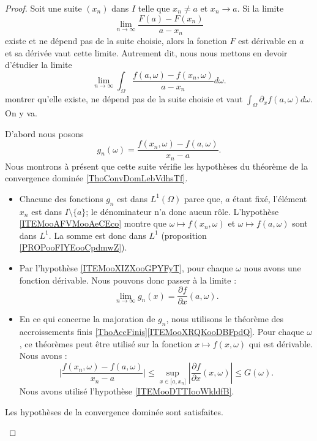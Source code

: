 \begin{proof}
	Soit une suite \( (x_n)\) dans \( I\) telle que \( x_n\neq a\) et \( x_n\to a\). Si la limite
	\begin{equation}
		\lim_{n\to \infty} \frac{ F(a)-F(x_n) }{ a-x_n }
	\end{equation}
	existe et ne dépend pas de la suite choisie, alors la fonction \( F\) est dérivable en \( a\) et sa dérivée vaut cette limite. Autrement dit, nous nous mettons en devoir d'étudier la limite
	\begin{equation}    \label{EqLIiralx}
		\lim_{n\to \infty} \int_{\Omega}\frac{ f(a,\omega)-f(x_n,\omega) }{ a-x_n }d\omega.
	\end{equation}
	montrer qu'elle existe, ne dépend pas de la suite choisie et vaut \( \int_{\Omega}\partial_xf(a,\omega)d\omega\). On y va.

	\begin{subproof}
		D'abord nous posons
		\begin{equation}    \label{EqAFOUbQB}
			g_n(\omega)=\frac{ f(x_n,\omega)-f(a,\omega) }{ x_n-a }.
		\end{equation}
		Nous montrons à présent que cette suite vérifie les hypothèses du théorème de la convergence dominée \ref{ThoConvDomLebVdhsTf}.
		\begin{itemize}
			\item
			      Chacune des fonctions \( g_n\) est dans \( L^1(\Omega)\) parce que, \( a\) étant fixé, l'élément \( x_n\) est dans \( I\setminus\{ a \}\); le dénominateur n'a donc aucun rôle. L'hypothèse \ref{ITEMooAFVMooAeCEco} montre que \( \omega\mapsto f(x_n,\omega)\) et \( \omega\mapsto f(a,\omega)\) sont dans \( L^1\). La somme est donc dans \( L^1\) (proposition \ref{PROPooFIYEooCpdmwZ}).
			\item
			      Par l'hypothèse \ref{ITEMooXIZXooGPYFyT}, pour chaque \( \omega\) nous avons une fonction dérivable. Nous pouvons donc passer à la limite :
			      \begin{equation}
				      \lim_{n\to \infty} g_n(x)=\frac{ \partial f }{ \partial x }(a,\omega).
			      \end{equation}
			\item
			      En ce qui concerne la majoration de \( g_n\), nous utilisons le théorème des accroissements finis \ref{ThoAccFinis}\ref{ITEMooXRQKooDBFpdQ}. Pour chaque \( \omega\), ce théorèmes peut être utilisé sur la fonction \( x\mapsto f(x,\omega)\) qui est dérivable. Nous avons :
			      \begin{equation}
				      \big| \frac{  f(x_n,\omega)-f(a,\omega)   }{ x_n-a  } \big|\leq \sup_{x\in \mathopen[ a , x_n \mathclose]}| \frac{ \partial f }{ \partial x }(x,\omega) |\leq G(\omega).
			      \end{equation}
			      Nous avons utilisé l'hypothèse \ref{ITEMooDTTIooWkldfB}.
		\end{itemize}
		Les hypothèses de la convergence dominée sont satisfaites.


\end{subproof}
\end{proof}
